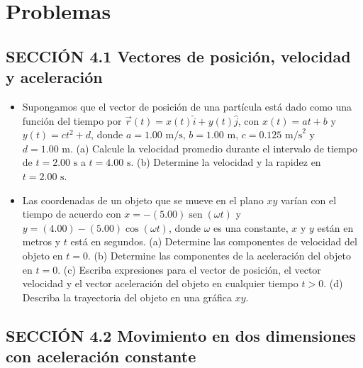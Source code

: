 \documentclass[11pt,a4paper]{article}
\begin{document}
\section*{Problemas}

\subsection*{SECCIÓN 4.1 Vectores de posición, velocidad y aceleración}

\begin{itemize}
    \item[\textbf{1.}] Supongamos que el vector de posición de una partícula está dado como una función del tiempo por $\vec{r}(t) = x(t)\hat{i} + y(t)\hat{j}$, con $x(t) = at + b$ y $y(t) = ct^2 + d$, donde $a = 1.00 \text{ m/s}$, $b = 1.00 \text{ m}$, $c = 0.125 \text{ m/s}^2$ y $d = 1.00 \text{ m}$. (a) Calcule la velocidad promedio durante el intervalo de tiempo de $t = 2.00 \text{ s}$ a $t = 4.00 \text{ s}$. (b) Determine la velocidad y la rapidez en $t = 2.00 \text{ s}$.
    \vspace*{6cm}

    \item[\textbf{2.}] Las coordenadas de un objeto que se mueve en el plano $xy$ varían con el tiempo de acuerdo con $x = -(5.00) \operatorname{sen}(\omega t)$ y $y = (4.00) - (5.00) \cos(\omega t)$, donde $\omega$ es una constante, $x$ y $y$ están en metros y $t$ está en segundos. (a) Determine las componentes de velocidad del objeto en $t = 0$. (b) Determine las componentes de la aceleración del objeto en $t = 0$. (c) Escriba expresiones para el vector de posición, el vector velocidad y el vector aceleración del objeto en cualquier tiempo $t > 0$. (d) Describa la trayectoria del objeto en una gráfica $xy$.
    \vspace*{8cm}
\end{itemize}

\newpage

\subsection*{SECCIÓN 4.2 Movimiento en dos dimensiones con aceleración constante}
\end{document}
